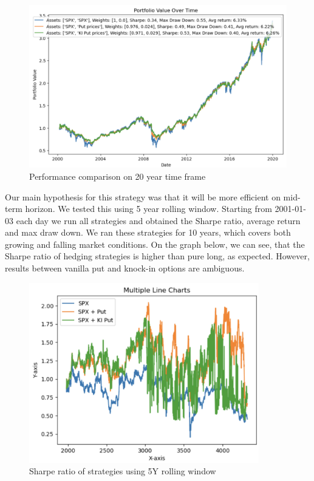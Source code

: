 \documentclass[12pt]{article}
\begin{document}
{{\begin{figure}[htp]
    \centering
    \includegraphics[width=14cm]{20years.png}
    \caption{Performance comparison on 20 year time frame}
    \label{fig:galaxy}
\end{figure}

\qquad Our main hypothesis for this strategy was that it will be more efficient on mid-term horizon. We tested this using 5 year rolling window. Starting from 2001-01-03 each day we run all strategies and obtained the Sharpe ratio, average return and max draw down. We ran these strategies for 10 years, which covers both growing and falling market conditions. On the graph below, we can see, that the Sharpe ratio of hedging strategies is higher than pure long, as expected. However, results between vanilla put and knock-in options are ambiguous.  \\

\begin{figure}[htp]
    \centering
    \includegraphics[width=10cm]{5Yrolling.png}
    \caption{Sharpe ratio of strategies using 5Y rolling window}
    \label{fig:galaxy}
\end{figure}

}}
\end{document}
